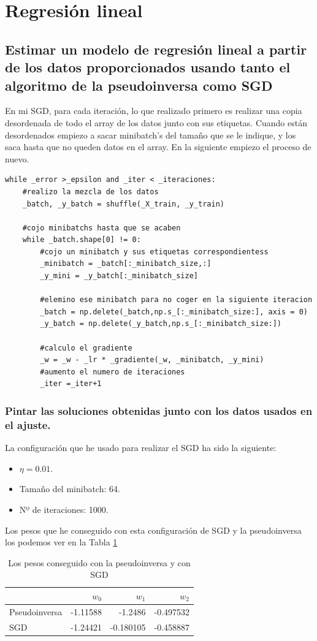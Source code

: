 \documentclass[12pt,a4paper]{article}
\begin{document}
\section{Regresión lineal}
\subsection{Estimar un modelo de regresión lineal a partir de los datos proporcionados usando tanto el algoritmo de la pseudoinversa como  SGD}
En mi SGD, para cada iteración, lo que realizado primero es realizar una copia desordenada de todo el array de los datos junto con sus etiquetas. Cuando están desordenados empiezo a sacar minibatch's del tamaño que se le indique, y los saca hasta que no queden datos en el array. En la siguiente empiezo el proceso de nuevo.
\begin{verbatim} 
while _error >_epsilon and _iter < _iteraciones:
	#realizo la mezcla de los datos
	_batch, _y_batch = shuffle(_X_train, _y_train)

	#cojo minibatchs hasta que se acaben
	while _batch.shape[0] != 0:
		#cojo un minibatch y sus etiquetas correspondientess
		_minibatch = _batch[:_minibatch_size,:]
		_y_mini = _y_batch[:_minibatch_size]
		
		#elemino ese minibatch para no coger en la siguiente iteracion
		_batch = np.delete(_batch,np.s_[:_minibatch_size:], axis = 0)
		_y_batch = np.delete(_y_batch,np.s_[:_minibatch_size:])
		
		#calculo el gradiente
		_w = _w - _lr * _gradiente(_w, _minibatch, _y_mini)
		#aumento el numero de iteraciones
		_iter =_iter+1
\end{verbatim}
\subsubsection{ Pintar las soluciones obtenidas junto con los datos usados en el ajuste.}
La configuración que he usado para realizar el SGD ha sido la siguiente:
\begin{itemize}
	\item $\eta=0.01$.
	\item Tamaño del minibatch: 64.
	\item Nº de iteraciones: 1000.
\end{itemize}
Los pesos que he conseguido con esta configuración de SGD y la pseudoinversa los podemos ver en la Tabla \ref{tab:pesos}
	
\begin{table}[H]
	\centering
	\caption {Los pesos conseguido con la pseudoinversa y con SGD} \label{tab:pesos} 
	
	\begin{tabular}{|l|r|r|r|}
		\hline
		\backslashbox{Método}{Pesos} & $w_0$ & $w_1$ & $w_2$\\ 
		\hline
		Pseudoinversa & -1.11588 & -1.2486  &-0.497532 \\
		\hline
		SGD & -1.24421 & -0.180105 & -0.458887\\
		\hline
	\end{tabular}
\end{table}
\end{document}
